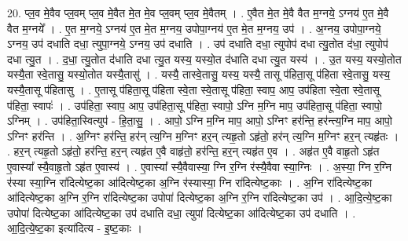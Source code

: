 \documentclass[17pt]{extarticle}
\begin{document}
20. प्ल॒व मे॒वैव प्ल॒वम् प्ल॒व मे॒वैत मे॒त मे॒व प्ल॒वम् प्ल॒व मे॒वैतम् । . ए॒वैत मे॒त मे॒वै वैत म॒ग्नये॒ ऽग्नय॑ ए॒त मे॒वै वैत म॒ग्नये᳚ । . ए॒त म॒ग्नये॒ ऽग्नय॑ ए॒त मे॒त म॒ग्नय॒ उपोपा॒ग्नय॑ ए॒त मे॒त म॒ग्नय॒ उप॑ । . अ॒ग्नय॒ उपोपा॒ग्नये॒ ऽग्नय॒ उप॑ दधाति दधा॒ त्युपा॒ग्नये॒ ऽग्नय॒ उप॑ दधाति । . उप॑ दधाति दधा॒ त्युपोप॑ दधा त्यु॒तोत द॑धा॒ त्युपोप॑ दधा त्यु॒त । . द॒धा॒ त्यु॒तोत द॑धाति दधा त्यु॒त यस्य॒ यस्यो॒त द॑धाति दधा त्यु॒त यस्य॑ । . उ॒त यस्य॒ यस्यो॒तोत यस्यै॒ता स्वे॒तासु॒ यस्यो॒तोत यस्यै॒तासु॑ । . यस्यै॒ तास्वे॒तासु॒ यस्य॒ यस्यै॒ तासू प॑हिता॒सू प॑हिता स्वे॒तासु॒ यस्य॒ यस्यै॒तासू प॑हितासु । . ए॒तासू प॑हिता॒सू प॑हिता स्वे॒ता स्वे॒तासू प॑हिता॒ स्वाप॒ आप॒ उप॑हिता स्वे॒ता स्वे॒तासू प॑हिता॒ स्वापः॑ । . उप॑हिता॒ स्वाप॒ आप॒ उप॑हिता॒सू प॑हिता॒ स्वापो॒ ऽग्नि म॒ग्नि माप॒ उप॑हिता॒सू प॑हिता॒ स्वापो॒ ऽग्निम् । . उप॑हिता॒स्वित्युप॑ - हि॒ता॒सु॒ । . आपो॒ ऽग्नि म॒ग्नि माप॒ आपो॒ ऽग्निꣳ हर॑न्ति॒ हर॑न्त्य॒ग्नि माप॒ आपो॒ ऽग्निꣳ हर॑न्ति । . अ॒ग्निꣳ हर॑न्ति॒ हर॑न् त्य॒ग्नि म॒ग्निꣳ हर॒न् त्यहृ॒तो ऽहृ॑तो॒ हर॑न् त्य॒ग्नि म॒ग्निꣳ हर॒न् त्यहृ॑तः । . हर॒न् त्यहृ॒तो ऽहृ॑तो॒ हर॑न्ति॒ हर॒न् त्यहृ॑त ए॒वै वाहृ॑तो॒ हर॑न्ति॒ हर॒न् त्यहृ॑त ए॒व । . अहृ॑त ए॒वै वाहृ॒तो ऽहृ॑त ए॒वास्या᳚ स्यै॒वाहृ॒तो ऽहृ॑त ए॒वास्य॑ । . ए॒वास्या᳚ स्यै॒वैवास्या॒ ग्नि र॒ग्नि र॑स्यै॒वैवा स्या॒ग्निः । . अ॒स्या॒ ग्नि र॒ग्नि र॑स्या स्या॒ग्नि रा॑दित्येष्ट॒का आ॑दित्येष्ट॒का अ॒ग्नि र॑स्यास्या॒ ग्नि रा॑दित्येष्ट॒काः । . अ॒ग्नि रा॑दित्येष्ट॒का आ॑दित्येष्ट॒का अ॒ग्नि र॒ग्नि रा॑दित्येष्ट॒का उपोपा॑ दित्येष्ट॒का अ॒ग्नि र॒ग्नि रा॑दित्येष्ट॒का उप॑ । . आ॒दि॒त्ये॒ष्ट॒का उपोपा॑ दित्येष्ट॒का आ॑दित्येष्ट॒का उप॑ दधाति दधा॒ त्युपा॑ दित्येष्ट॒का आ॑दित्येष्ट॒का उप॑ दधाति । . आ॒दि॒त्ये॒ष्ट॒का इत्या॑दित्य - इ॒ष्ट॒काः । \newline
\end{document}
